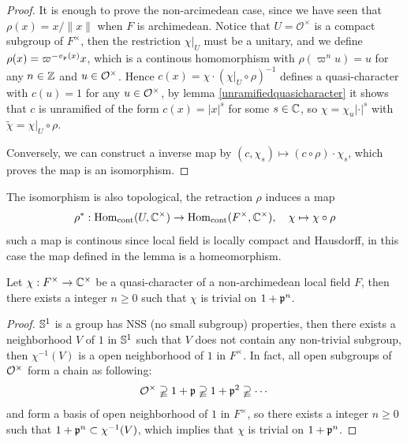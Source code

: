 \begin{proof}
    It is enough to prove the non-arcimedean case, since we have seen that \(\rho(x) = x/\|x\|\) when \(F\) is archimedean. Notice that \(U = \mathcal{O}^\times\) is a compact subgroup of \(F^\times\), then the restriction \(\chi|_U\) must be a unitary, and we define \(\rho(x) = \varpi^{-v_{\mathfrak{p}}(x)}x\), which is a continous homomorphism with \(\rho(\varpi^nu) = u\) for any \(n \in \mathbb{Z}\) and \(u \in \mathcal{O}^\times\). Hence \(c(x) = \chi \cdot (\chi|_U \circ \rho)^{-1}\) defines a quasi-character with \(c(u) = 1\) for any \(u \in \mathcal{O}^\times\), by lemma \ref{unramifiedquasicharacter} it shows that \(c\) is unramified of the form \(c(x) = |x|^s\) for some \(s \in \mathbb{C}\), so \(\chi = \chi_u  |\cdot|^s\) with \(\tilde{\chi} = \chi|_U \circ \rho\).

    Conversely, we can construct a inverse map by \((c,\chi_s) \mapsto (c \circ \rho)\cdot \chi_s\), which proves the map is an isomorphism. 
\end{proof}

\begin{remark}
    The isomorphism is also topological, the retraction \(\rho\) induces a map
    \[\rho^*: \operatorname{Hom}_{\text{cont}}(U,\mathbb{C}^\times) \to \operatorname{Hom}_{\text{cont}}(F^\times,\mathbb{C}^\times), \quad \chi \mapsto \chi \circ \rho\]
    such a map is continous since local field is locally compact and Hausdorff, in this case the map defined in the lemma is a homeomorphism.
\end{remark}



\begin{lemma}
    Let \(\chi:F^\times \to \mathbb{C}^\times\) be a quasi-character of a non-archimedean local field \(F\), then there exists a integer \(n \geq 0\) such that \(\chi\) is trivial on \(1 + \mathfrak{p}^n\).
\end{lemma}
\begin{proof}
    \(\mathbb{S}^1\) is a group has NSS (no small subgroup) properties, then there exists a neighborhood \(V\) of \(1\) in \(\mathbb{S}^1\) such that \(V\) does not contain any non-trivial subgroup, then \(\chi^{-1}(V)\) is a open neighborhood of \(1\) in \(F^\times\). In fact, all open subgroups of \(\mathcal{O}^\times\) form a chain  as following:
\[\mathcal{O}^\times \varsupsetneqq 1+\mathfrak{p} \varsupsetneqq 1+\mathfrak{p}^2 \varsupsetneqq \cdots\]
and form a basis of open neighborhood of \(1\) in \(F^\times\), so there exists a integer \(n \geq 0\) such that \(1 + \mathfrak{p}^n \subset \chi^{-1}(V)\), which implies that \(\chi\) is trivial on \(1 + \mathfrak{p}^n\).
\end{proof}

